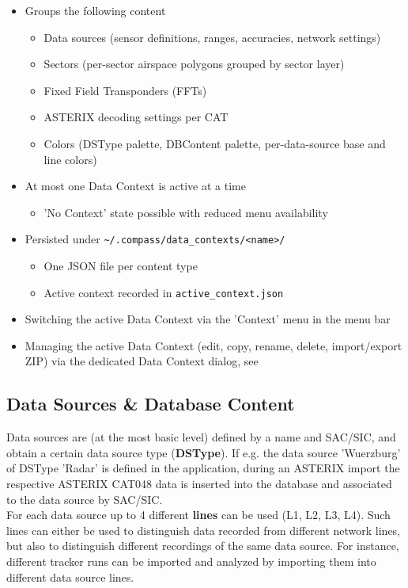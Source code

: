 \begin{itemize}
\item Groups the following content
\begin{itemize}
\item Data sources (sensor definitions, ranges, accuracies, network settings)
\item Sectors (per-sector airspace polygons grouped by sector layer)
\item Fixed Field Transponders (FFTs)
\item ASTERIX decoding settings per CAT
\item Colors (DSType palette, DBContent palette, per-data-source base and line colors)
\end{itemize}
\item At most one Data Context is active at a time
\begin{itemize}
\item 'No Context' state possible with reduced menu availability
\end{itemize}
\item Persisted under \texttt{\textasciitilde/.compass/data\_contexts/<name>/}
\begin{itemize}
\item One JSON file per content type
\item Active context recorded in \texttt{active\_context.json}
\end{itemize}
\item Switching the active Data Context via the 'Context' menu in the menu bar
\item Managing the active Data Context (edit, copy, rename, delete, import/export ZIP) via the dedicated Data Context dialog, see 
\end{itemize}

\subsection*{Data Sources \& Database Content}

Data sources are (at the most basic level) defined by a name and SAC/SIC, and obtain a certain data source type (\textbf{DSType}). 
If e.g. the data source 'Wuerzburg' of DSType 'Radar' is defined in the application, during an ASTERIX import the respective ASTERIX CAT048 data is inserted into the database and associated to the data source by SAC/SIC. \\

For each data source up to 4 different \textbf{lines} can be used (L1, L2, L3, L4). 
Such lines can either be used to distinguish data recorded from different network lines, but also to distinguish different recordings of the same data source. 
For instance, different tracker runs can be imported and analyzed by importing them into different data source lines. \\

